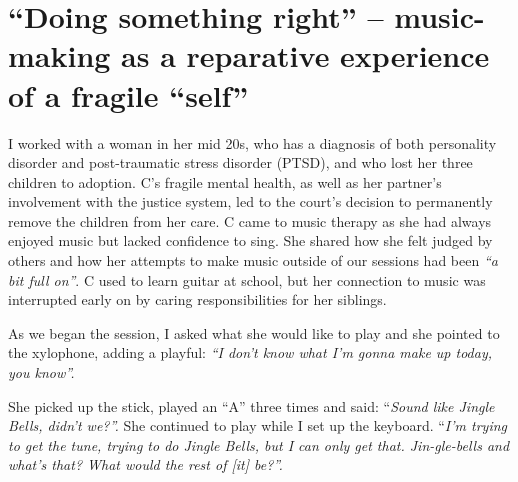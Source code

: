 \documentclass[authordate, empirical, issue]{jote-new-article}
\begin{document}
\section{“Doing something right” -- music-making as a reparative experience of a fragile “self”}







I worked with a woman in her mid 20s, who has a diagnosis of both personality disorder and post-traumatic stress disorder (PTSD), and who lost her three children to adoption. C's fragile mental health, as well as her partner's involvement with the justice system, led to the court's decision to permanently remove the children from her care. C came to music therapy as she had always enjoyed music but lacked confidence to sing. She shared how she felt judged by others and how her attempts to make music outside of our sessions had been \emph{“a bit full on”}. C used to learn guitar at school, but her connection to music was interrupted early on by caring responsibilities for her siblings.







As we began the session, I asked what she would like to play and she pointed to the xylophone, adding a playful: \emph{“I don't know what I'm gonna make up today, you know”. }



She picked up the stick, played an “A” three times and said: “\emph{Sound like Jingle Bells, didn't we?”. }She continued to play while I set up the keyboard. “\emph{I'm trying to get the tune, trying to do Jingle Bells, but I can only get that. Jin-gle-bells and what's that? What would the rest of [it] be?”.}
\end{document}
